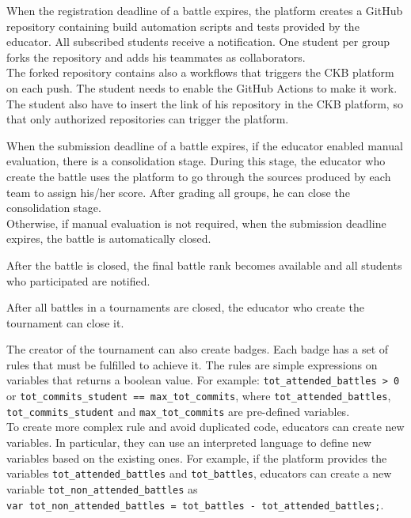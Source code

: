 When the registration deadline of a battle expires, the platform creates a GitHub repository containing build automation scripts and tests provided by the educator.
All subscribed students receive a notification.
One student per group forks the repository and adds his teammates as collaborators.\\
The forked repository contains also a workflows that triggers the CKB platform on each push.
The student needs to enable the GitHub Actions to make it work.
The student also have to insert the link of his repository in the CKB platform, so that only authorized repositories can trigger the platform.

When the submission deadline of a battle expires, if the educator enabled manual evaluation, there is a consolidation stage.
During this stage, the educator who create the battle uses the platform to go through the sources produced by each team to assign his/her score.
After grading all groups, he can close the consolidation stage.\\
Otherwise, if manual evaluation is not required, when the submission deadline expires, the battle is automatically closed.

After the battle is closed, the final battle rank becomes available and all students who participated are notified.

After all battles in a tournaments are closed, the educator who create the tournament can close it.

The creator of the tournament can also create badges.
Each badge has a set of rules that must be fulfilled to achieve it.
The rules are simple expressions on variables that returns a boolean value.
For example: \lstinline{tot_attended_battles > 0} or \lstinline{tot_commits_student == max_tot_commits}, 
where \lstinline{tot_attended_battles}, \lstinline{tot_commits_student} and \lstinline{max_tot_commits} are pre-defined variables.\\
To create more complex rule and avoid duplicated code, educators can create new variables.
In particular, they can use an interpreted language to define new variables based on the existing ones.
For example, if the platform provides the variables \lstinline{tot_attended_battles} and \lstinline{tot_battles}, 
educators can create a new variable \lstinline{tot_non_attended_battles} as\\
\lstinline{var tot_non_attended_battles = tot_battles - tot_attended_battles;}.

